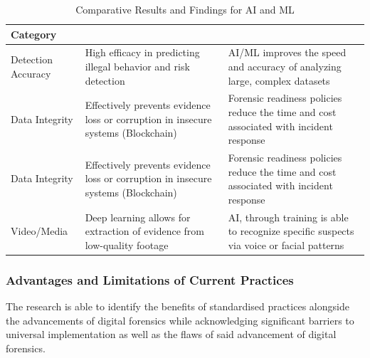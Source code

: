 \documentclass[12pt,a4paper]{article}
\begin{document}
\begin{table}[H]
\caption{Comparative Results and Findings for AI and ML}
\label{tab:inclusion-exclusion}

\fontsize{10pt}{12pt}\selectfont

\begin{tabular}{|p{4cm}|p{5cm}|p{5cm}|}

\hline

\centering\textbf{Category} &
\centering\textbf{\cite{vaddi2024enhancements}} &
\centering\textbf{\cite{alenezi2023digital}} %
\tabularnewline

\hline

\centering Detection Accuracy &
\centering High efficacy in predicting illegal behavior and risk detection &
\centering AI/ML improves the speed and accuracy of analyzing large, complex datasets 
\tabularnewline
\hline

\centering Data Integrity &
\centering Effectively prevents evidence loss or corruption in insecure systems (Blockchain) &
\centering Forensic readiness policies reduce the time and cost associated with incident response
\tabularnewline
\hline

\centering Data Integrity &
\centering Effectively prevents evidence loss or corruption in insecure systems (Blockchain) &
\centering Forensic readiness policies reduce the time and cost associated with incident response
\tabularnewline
\hline

\centering Video/Media &
\centering Deep learning allows for extraction of evidence from low-quality footage &
\centering AI, through training is able to recognize specific suspects via voice or facial patterns
\tabularnewline
\hline

\end{tabular}
\end{table}

\subsubsection{Advantages and Limitations of Current Practices}
The research is able to identify the benefits of standardised practices alongside the advancements of digital forensics while acknowledging significant barriers to universal implementation as well as the flaws of said advancement of digital forensics.
\end{document}
